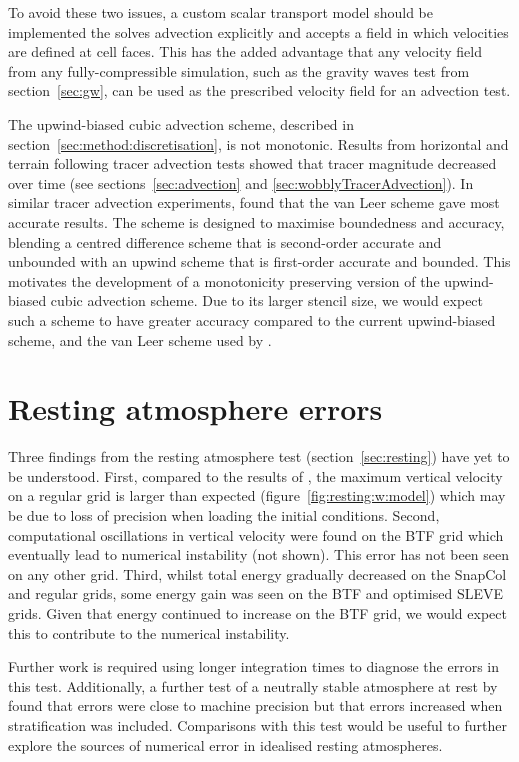 To avoid these two issues, a custom scalar transport model should be implemented the solves advection explicitly and accepts a field in which velocities are defined at cell faces.  This has the added advantage that any velocity field from any fully-compressible simulation, such as the gravity waves test from section~\ref{sec:gw}, can be used as the prescribed velocity field for an advection test.

The upwind-biased cubic advection scheme, described in section~\ref{sec:method:discretisation}, is not monotonic.  Results from horizontal and terrain following tracer advection tests showed that tracer magnitude decreased over time (see sections~\ref{sec:advection} and \ref{sec:wobblyTracerAdvection}).
In similar tracer advection experiments, \textcite{jones2013} found that the van Leer scheme gave most accurate results.  The scheme is designed to maximise boundedness and accuracy, blending a centred difference scheme that is second-order accurate and unbounded with an upwind scheme that is first-order accurate and bounded.  This motivates the development of a monotonicity preserving version of the upwind-biased cubic advection scheme.  Due to its larger stencil size, we would expect such a scheme to have greater accuracy compared to the current upwind-biased scheme, and the van Leer scheme used by \textcite{jones2013}.

\section{Resting atmosphere errors}

Three findings from the resting atmosphere test (section~\ref{sec:resting}) have yet to be understood.  First, compared to the results of \textcite{good2013}, the maximum vertical velocity on a regular grid is larger than expected (figure~\ref{fig:resting:w:model}) which may be due to loss of precision when loading the initial conditions.
Second, computational oscillations in vertical velocity were found on the BTF grid which eventually lead to numerical instability (not shown).  This error has not been seen on any other grid.
Third, whilst total energy gradually decreased on the SnapCol and regular grids, some energy gain was seen on the BTF and optimised SLEVE grids.  Given that energy continued to increase on the BTF grid, we would expect this to contribute to the numerical instability.

Further work is required using longer integration times to diagnose the errors in this test.  Additionally, a further test of a neutrally stable atmosphere at rest by \textcite{botta2004} found that errors were close to machine precision but that errors increased when stratification was included.  Comparisons with this test would be useful to further explore the sources of numerical error in idealised resting atmospheres.

